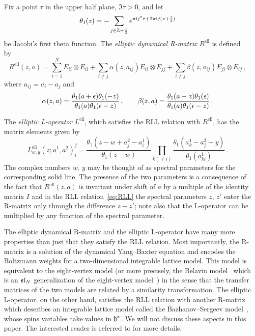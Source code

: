 Fix a point $\tau$ in the upper half plane, $\Im\tau > 0$, and let
 \begin{equation}
  \theta_1(z)
  =
  - \sum_{j \in \mathbb{Z} + \frac12} e^{\pi\mathrm{i} j^2\tau + 2\pi\mathrm{i} j(z + \frac12)}
\end{equation}
be Jacobi's first theta function.  The \emph{elliptic dynamical
  R-matrix} $R^{\text{ell}}$ is defined by~\cite{Felder:1994be,
  Felder:1994pb, MR1645196}
\begin{equation}
  R^{\text{ell}}(z,a)
  =
  \sum_{i=1}^N E_{ii} \otimes E_{ii}
  + \sum_{i \neq j} \alpha(z,a_{ij}) E_{ii} \otimes E_{jj}
  + \sum_{i \neq j} \beta(z,a_{ij}) E_{ji} \otimes E_{ij}
  \,,
\end{equation}
where $a_{ij} = a_i - a_j$ and
\begin{equation}
  \alpha(z,a)
  = \frac{\theta_1(a+\epsilon) \theta_1(-z)}
         {\theta_1(a) \theta_1(\epsilon - z)} \,,
  \qquad
  \beta(z,a)
  = \frac{\theta_1(a - z) \theta_1(\epsilon)}
          {\theta_1(a) \theta_1(\epsilon - z)} \,.
\end{equation}

The \emph{elliptic L-operator} $L^{\text{ell}}$, which satisfies the
RLL relation with $R^{\text{ell}}$, has the matrix elements given
by~\cite{MR1463830}
\begin{equation}
  \label{eq:L-ell}
  L^{\text{ell}}_{w,y}(z; a^1, a^2)^j_i
  =
  \frac{\theta_1(z - w + a^2_j - a^1_i)}{\theta_1(z - w)}
  \prod_{k (\neq i)}
  \frac{\theta_1(a^1_k - a^2_j - y)}{\theta_1(a^1_{ki})}
  \,.
\end{equation}
The complex numbers $w$, $y$ may be thought of as spectral parameters
for the corresponding solid line.  The presence of the two parameters
is a consequence of the fact that $R^{\text{ell}}(z,a)$ is invariant
under shift of $a$ by a multiple of the identity matrix $I$ and in the
RLL relation~\eqref{eq:RLL} the spectral parameters $z$, $z'$ enter
the R-matrix only through the difference $z - z'$; note also that the
L-operator can be multiplied by any function of the spectral
parameter.

The elliptic dynamical R-matrix and the elliptic L-operator have many
more properties than just that they satisfy the RLL relation.  Most
importantly, the R-matrix is a solution of the dynamical Yang--Baxter
equation and encodes the Boltzmann weights for a two-dimensional
integrable lattice model.  This model is equivalent to the
eight-vertex model (or more precisely, the Belavin
model~\cite{Belavin:1981ix} which is an $\mathfrak{sl}_N$ generalization of the
eight-vertex model~\cite{Baxter:1971cr, Baxter:1972hz}) in the sense
that the transfer matrices of the two models are related by a
similarity transformation.  The elliptic L-operator, on the other
hand, satisfies the RLL relation with another R-matrix which describes
an integrable lattice model called the Bazhanov--Sergeev
model~\cite{Bazhanov:2010kz, Bazhanov:2011mz}, whose spins variables
take values in $\mathfrak{h}^*$.  We will not discuss these aspects in this
paper.  The interested reader is referred to \cite{Yagi:2017hmj} for
more details.





